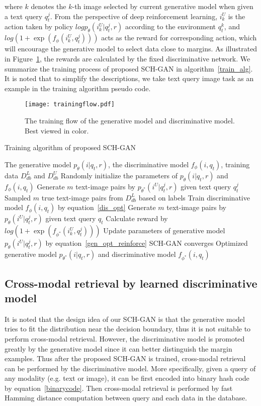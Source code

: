 \documentclass[journal]{IEEEtran}
\begin{document}
where $k$ denotes the $k$-th image selected by current generative model when given a text query $q_t^j$. From the perspective of deep reinforcement learning, $i_k^U$ is the action taken by policy $logp_{\theta}(i_k^U|q_t^j,r)$ according to the environment $q_t^k$, and $log(1+\exp(f_\phi(i_k^U,q_t^j)))$ acts as the reward for corresponding action, which will encourage the generative model to select data close to margins. As illustrated in Figure~\ref{trainignflow}, the rewards are calculated by the fixed discriminative network. We summarize the training process of proposed SCH-GAN in algorithm~\ref{train_alg}. It is noted that to simplify the descriptions, we take text query image task as an example in the training algorithm pseudo code.
\begin{figure}[thb]
	\centering
	\texttt{[image: trainingflow.pdf]}
	\caption{The training flow of the generative model and discriminative model. Best viewed in color.}
	\label{trainignflow}
\end{figure}

\begin{algorithm}
	\caption{Training algorithm of proposed SCH-GAN}
	\label{train_alg}
	\begin{algorithmic}[1]
		\REQUIRE The generative model $p_{\theta}(i|q_t,r)$, the discriminative model $f_{\phi}(i,q_t)$, training data $D_{db}^L$ and $D_{db}^U$
		\STATE Randomly initialize the parameters of $p_{\theta}(i|q_t,r)$ and $f_{\phi}(i,q_t)$
		\REPEAT
		\STATE Generate $m$ text-image pairs by $p_{\theta^\ast}(i^U|q_t^j,r)$ given text query $q_t^j$
		\STATE Sampled $m$ true text-image pairs from $D_{db}^L$ based on labels
		\STATE Train discriminative model $f_{\phi}(i,q_t)$ by equation~\ref{dis_opt}
		\ENDFOR
		\STATE Generate $m$ text-image pairs by $p_{\theta}(i^U|q_t^j,r)$ given text query $q_t$
		\STATE Calculate reward by $log(1+\exp(f_{\phi^\ast}(i_k^U,q_t^j)))$
		\STATE Update parameters of generative model $p_{\theta}(i^U|q_t^j,r)$ by equation~\ref{gen_opt_reinforce}
		\ENDFOR
		\UNTIL SCH-GAN converges
		\ENSURE Optimized generative model $p_{\theta^*}(i|q_t,r)$ and discriminative model $f_{\phi^*}(i,q_t)$
	\end{algorithmic}
\end{algorithm}

\subsection{Cross-modal retrieval by learned discriminative model}
It is noted that the design idea of our SCH-GAN is that the generative model tries to fit the distribution near the decision boundary, thus it is not suitable to perform cross-modal retrieval. However, the discriminative model is promoted greatly by the generative model since it can better distinguish the margin examples. Thus after the proposed SCH-GAN is trained, cross-modal retrieval can be performed by the discriminative model. More specifically, given a query of any modality (e.g. text or image), it can be first encoded into binary hash code by equation~\ref{binarycode}. Then cross-modal retrieval is performed by fast Hamming distance computation between query and each data in the database.
\end{document}
